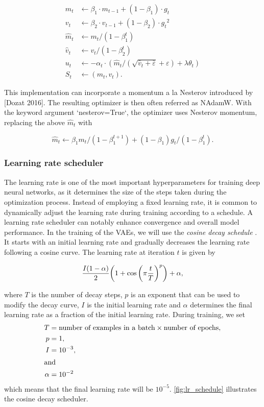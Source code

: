 \begin{align*}
  m_t &\leftarrow \beta_1 \cdot m_{t-1} + (1-\beta_1) \cdot g_t \\
  v_t &\leftarrow \beta_2 \cdot v_{t-1} + (1-\beta_2) \cdot {g_t}^2 \\
  \hat{m}_t &\leftarrow m_t / {(1-\beta_1^t)} \\
  \hat{v}_t &\leftarrow v_t / {(1-\beta_2^t)} \\
  u_t &\leftarrow -\alpha_t \cdot \left( \hat{m}_t / \left({\sqrt{\hat{v}_t 
  + \bar{\varepsilon}} + \varepsilon} \right) + \lambda \theta_{t} \right)\\
  S_t &\leftarrow (m_t, v_t).
\end{align*}

This implementation can incorporate a momentum a la Nesterov introduced by [Dozat 2016]. The resulting optimizer is then often referred as NAdamW. With the keyword argument `nesterov=True`, the optimizer uses Nesterov momentum, replacing the above $\hat{m}_t$ with

 \begin{equation*}
    \hat{m}_t \leftarrow
    \beta_1 m_t / {(1-\beta_1^{t+1})} + (1 - \beta_1) g_t / {(1-\beta_1^t)}. 
 \end{equation*}


\subsubsection{Learning rate scheduler}

The learning rate is one of the most important hyperparameters for training deep neural networks, as it determines the size of the steps taken during the optimization process. Instead of employing a fixed learning rate, it is common to dynamically adjust the learning rate during training according to a schedule. A learning rate scheduler can notably enhance convergence and overall model performance. In the training of the VAEs, we will use the \textit{cosine decay schedule} \citep{cosine_decay}. It starts with an initial learning rate and gradually decreases the learning rate following a cosine curve. The learning rate at iteration $t$ is given by

\begin{equation}\label{eq:cosine_decay}
    \frac{I \qty(1 - \alpha)}{2} \qty(1 + \cos \qty(\pi \frac{t}{T})^p) + \alpha,
\end{equation}

where $T$ is the number of decay steps, $p$ is an exponent that can be used to modify the decay curve, $I$ is the initial learning rate and $\alpha$ determines the final learning rate as a fraction of the initial learning rate. During training, we set 
\begin{align*}
    T &= \text{number of examples in a batch} \times \text{number of epochs}, \\
    p &= 1, \\
    I &= 10^{-3}, \\
    \intertext{and}
    \alpha &= 10^{-2}
\end{align*}
which means that the final learning rate will be $10^{-5}$. \autoref{fig:lr_schedule} illustrates the cosine decay scheduler.

